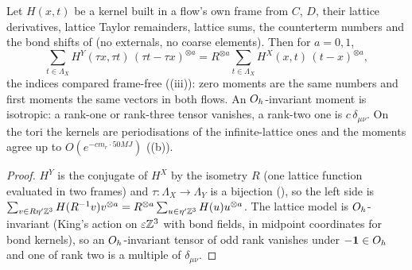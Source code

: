 \begin{lemma}\label{rot:h1s:Z0}
Let $H(x,t)$ be a kernel built in a flow's own frame from $C$, $D$, their lattice derivatives, lattice Taylor remainders, lattice sums, the counterterm numbers and the bond shifts of  (no externals, no coarse elements). Then for $a=0,1$,
\[
\sum_{t\in\Lambda_X}H^Y(\tau x,\tau t)\,(\tau t-\tau x)^{\otimes a}=R^{\otimes a}\sum_{t\in\Lambda_X}H^X(x,t)\,(t-x)^{\otimes a},
\]
the indices compared frame-free ((iii)): zero moments are the same numbers and first moments the same vectors in both flows. An $O_h$-invariant moment is isotropic: a rank-one or rank-three tensor vanishes, a rank-two one is $c\,\delta_{\mu\nu}$. On the tori the kernels are periodisations of the infinite-lattice ones and the moments agree up to $O(e^{-cm_r\cdot50MJ})$ ((b)).
\end{lemma}
\begin{proof}
$H^Y$ is the conjugate of $H^X$ by the isometry $R$ (one lattice function evaluated in two frames) and $\tau:\Lambda_X\to\Lambda_Y$ is a bijection (), so the left side is $\sum_{v\in R\eta'\mathbb Z^3}H(R^{-1}v)v^{\otimes a}=R^{\otimes a}\sum_{u\in\eta'\mathbb Z^3}H(u)u^{\otimes a}$. The lattice model is $O_h$-invariant (King's action on $\varepsilon\mathbb Z^3$ with bond fields, in midpoint coordinates for bond kernels), so an $O_h$-invariant tensor of odd rank vanishes under $-\mathbf 1\in O_h$ and one of rank two is a multiple of $\delta_{\mu\nu}$.
\end{proof}

